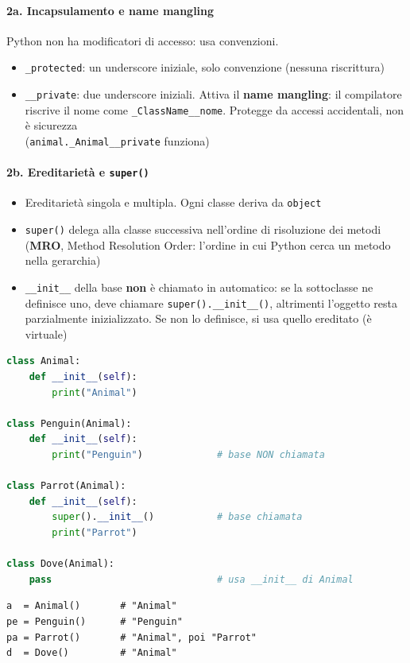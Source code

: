 \documentclass[12pt]{extarticle}
\begin{document}
\paragraph{2a. Incapsulamento e name mangling} Python non ha modificatori di accesso: usa convenzioni.
\begin{itemize}
    \item \texttt{\_protected}: un underscore iniziale, solo convenzione (nessuna riscrittura)
    \item \texttt{\_\_private}: due underscore iniziali. Attiva il \textbf{name mangling}: il compilatore riscrive il nome come \texttt{\_ClassName\_\_nome}. Protegge da accessi accidentali, non è sicurezza\\(\texttt{animal.\_Animal\_\_private} funziona)
\end{itemize}

\paragraph{2b. Ereditarietà e \texttt{super()}}
\begin{itemize}
    \item Ereditarietà singola e multipla. Ogni classe deriva da \texttt{object}
    \item \texttt{super()} delega alla classe successiva nell'ordine di risoluzione dei metodi (\textbf{MRO}, Method Resolution Order: l'ordine in cui Python cerca un metodo nella gerarchia)
    \item \texttt{\_\_init\_\_} della base \textbf{non} è chiamato in automatico: se la sottoclasse ne definisce uno, deve chiamare \texttt{super().\_\_init\_\_()}, altrimenti l'oggetto resta parzialmente inizializzato. Se non lo definisce, si usa quello ereditato (è virtuale)
\end{itemize}
\begin{lstlisting}[language=Python]
class Animal:
    def __init__(self):
        print("Animal")

class Penguin(Animal):
    def __init__(self):
        print("Penguin")             # base NON chiamata

class Parrot(Animal):
    def __init__(self):
        super().__init__()           # base chiamata
        print("Parrot")

class Dove(Animal):
    pass                             # usa __init__ di Animal
\end{lstlisting}
\begin{lstlisting}
a  = Animal()       # "Animal"
pe = Penguin()      # "Penguin"
pa = Parrot()       # "Animal", poi "Parrot"
d  = Dove()         # "Animal"
\end{lstlisting}
\end{document}
